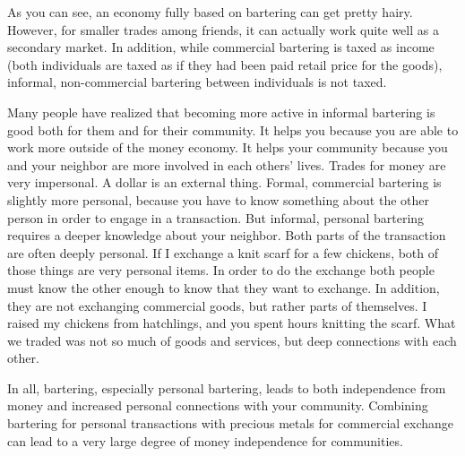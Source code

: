 As you can see, an economy fully based on bartering can get pretty hairy.  However,
for smaller trades among friends, it can actually work quite well as a secondary
market.  In addition, while commercial bartering is taxed as income (both individuals
are taxed as if they had been paid retail price for the goods), informal, non-commercial
bartering between individuals is not taxed.

Many people have realized that becoming more active in informal bartering is good both
for them and for their community.  It helps you because you are able to work more outside
of the money economy.  It helps your community because you and your neighbor are more
involved in each others' lives.  Trades for money are very impersonal.  A dollar is
an external thing.  Formal, commercial bartering is slightly more personal, because
you have to know something about the other person in order to engage in a transaction.
But informal, personal bartering requires a deeper knowledge about your neighbor.
Both parts of the transaction are often deeply personal.  If I exchange a knit scarf
for a few chickens, both of those things are very personal items.  In order to do
the exchange both people must know the other enough to know that they want to exchange.
In addition, they are not exchanging commercial goods, but rather parts of themselves.
I raised my chickens from hatchlings, and you spent hours knitting the scarf.  What
we traded was not so much of goods and services, but deep connections with each other.

In all, bartering, especially personal bartering, leads to both independence
from money and increased personal connections with your community.  Combining bartering
for personal transactions with precious metals for commercial exchange can lead to a 
very large degree of money independence for communities.

